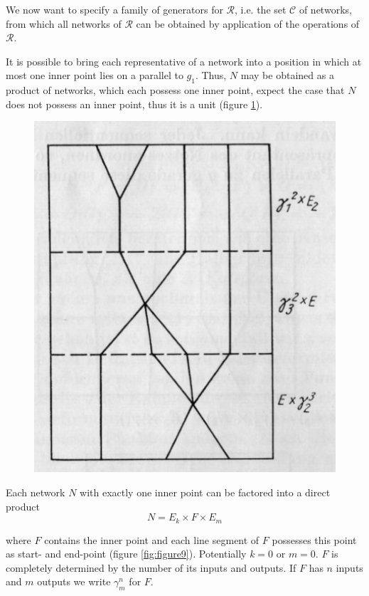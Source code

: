\documentclass{article}
\begin{document}
We now want to specify a family of generators for $\mathcal{R}$, i.e. the set $\mathcal{C}$ of networks, from which all networks of $\mathcal{R}$ can be obtained by application of the operations of $\mathcal{R}$.

It is possible to bring each representative of a network into a position in which at most one inner point lies on a parallel to $g_1$. Thus, $N$ may be obtained as a product of networks, which each possess one inner point, expect the case that $N$ does not possess an inner point, thus it is a unit (figure \ref{fig:figure8}).

\begin{figure}
\includegraphics[]{figure8.png}
\caption{}
\label{fig:figure8}
\end{figure}

Each network $N$ with exactly one inner point can be factored into a direct product 
\[
N = E_k \times F \times E_m
\]

where $F$ contains the inner point and each line segment of $F$ possesses this point as start- and end-point (figure \ref{fig:figure9}). Potentially $k = 0$ or $m = 0$. $F$ is completely determined by the number of its inputs and outputs. If $F$ has $n$ inputs and $m$ outputs we write $\gamma_m^n$ for $F$.
\end{document}
